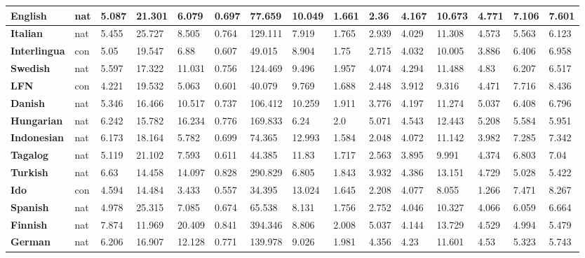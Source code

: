 \documentclass[12pt,a4paper]{article}
\numberwithin{figure}{section}
\numberwithin{table}{section}
\numberwithin{definition}{section}
\begin{document}
\begin{table}[!h]
\begin{adjustbox}{width=\textwidth}
\begin{tabular}{|l|l|l|l|l|l|l|l|l|l|l|l|l|l|l|}
        \textbf{English} & nat & 5.087 & 21.301 & 6.079 & 0.697 & 77.659 & 10.049 & 1.661 & 2.36 & 4.167 & 10.673 & 4.771 & 7.106 & 7.601 \\ \hline
        \textbf{Italian} & nat & 5.455 & 25.727 & 8.505 & 0.764 & 129.111 & 7.919 & 1.765 & 2.939 & 4.029 & 11.308 & 4.573 & 5.563 & 6.123 \\ \hline
        \textbf{Interlingua} & con & 5.05 & 19.547 & 6.88 & 0.607 & 49.015 & 8.904 & 1.75 & 2.715 & 4.032 & 10.005 & 3.886 & 6.406 & 6.958 \\ \hline
        \textbf{Swedish} & nat & 5.597 & 17.322 & 11.031 & 0.756 & 124.469 & 9.496 & 1.957 & 4.074 & 4.294 & 11.488 & 4.83 & 6.207 & 6.517 \\ \hline
        \textbf{LFN} & con & 4.221 & 19.532 & 5.063 & 0.601 & 40.079 & 9.769 & 1.688 & 2.448 & 3.912 & 9.316 & 4.471 & 7.716 & 8.436 \\ \hline
        \textbf{Danish} & nat & 5.346 & 16.466 & 10.517 & 0.737 & 106.412 & 10.259 & 1.911 & 3.776 & 4.197 & 11.274 & 5.037 & 6.408 & 6.796 \\ \hline
        \textbf{Hungarian} & nat & 6.242 & 15.782 & 16.234 & 0.776 & 169.833 & 6.24 & 2.0 & 5.071 & 4.543 & 12.443 & 5.208 & 5.584 & 5.951 \\ \hline
        \textbf{Indonesian} & nat & 6.173 & 18.164 & 5.782 & 0.699 & 74.365 & 12.993 & 1.584 & 2.048 & 4.072 & 11.142 & 3.982 & 7.285 & 7.342 \\ \hline
        \textbf{Tagalog} & nat & 5.119 & 21.102 & 7.593 & 0.611 & 44.385 & 11.83 & 1.717 & 2.563 & 3.895 & 9.991 & 4.374 & 6.803 & 7.04 \\ \hline
        \textbf{Turkish} & nat & 6.63 & 14.458 & 14.097 & 0.828 & 290.829 & 6.805 & 1.843 & 3.932 & 4.386 & 13.151 & 4.729 & 5.028 & 5.422 \\ \hline
        \textbf{Ido} & con & 4.594 & 14.484 & 3.433 & 0.557 & 34.395 & 13.024 & 1.645 & 2.208 & 4.077 & 8.055 & 1.266 & 7.471 & 8.267 \\ \hline
        \textbf{Spanish} & nat & 4.978 & 25.315 & 7.085 & 0.674 & 65.538 & 8.131 & 1.756 & 2.752 & 4.046 & 10.327 & 4.066 & 6.059 & 6.664 \\ \hline
        \textbf{Finnish} & nat & 7.874 & 11.969 & 20.409 & 0.841 & 394.346 & 8.806 & 2.008 & 5.037 & 4.144 & 13.729 & 4.529 & 4.994 & 5.479 \\ \hline
        \textbf{German} & nat & 6.206 & 16.907 & 12.128 & 0.771 & 139.978 & 9.026 & 1.981 & 4.356 & 4.23 & 11.601 & 4.53 & 5.323 & 5.743 \\ \hline

\end{tabular}
\end{adjustbox}
\end{table}
\end{document}

